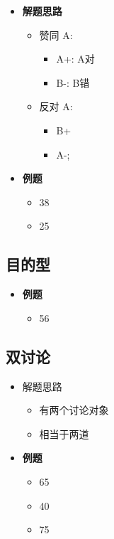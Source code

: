     \begin{itemize}
      \item \textbf{解题思路}
      \begin{itemize}
        \item 赞同 A:
        \begin{itemize}
          \item A+: A对
          \item B-: B错
        \end{itemize}

        \item 反对 A:
        \begin{itemize}
          \item B+
          \item A-;
        \end{itemize}
      \end{itemize}

      \item \textbf{例题}
      \begin{itemize}
        \item 38
        \item 25
      \end{itemize}
    \end{itemize}

  \subsection{目的型}

    \begin{itemize}
      \item \textbf{例题}
      \begin{itemize}
        \item 56
      \end{itemize}
    \end{itemize}

  \subsection{双讨论}

    \begin{itemize}
      \item 解题思路
      \begin{itemize}
        \item 有两个讨论对象
        \item 相当于两道
      \end{itemize}

      \item \textbf{例题}
      \begin{itemize}
        \item 65
        \item 40
        \item 75
      \end{itemize}
    \end{itemize}
